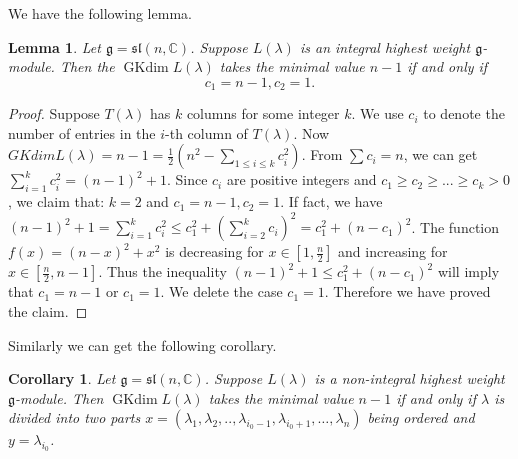 \documentclass{amsart}[12pt]
\newtheorem{Lem}{Lemma}[section]
\newtheorem{Cor}{Corollary}[section]
\newcommand{\gkd}{\operatorname{GKdim}}
\numberwithin{equation}{section}
\begin{document}
We have the following lemma.


\begin{Lem}\label{c12}
Let $ \mathfrak{g}=\mathfrak{sl}(n,\mathbb{C}) $. Suppose $L(\lambda)$ is an integral highest weight $\mathfrak{g}$-module. Then  the $\gkd L(\lambda)$ takes the minimal value $n-1$ if and only if
$$c_1=n-1, c_2=1.$$
\end{Lem}
\begin{proof} Suppose  $T(\lambda)$   has $k$  columns for some integer $k$. We use $ c_i $ to denote the number of entries in the $i$-th column of  $T(\lambda)$.
Now $GKdimL(\lambda)=n-1=\frac{1}{2}(n^2-\sum\limits_{1\leq i \leq k}c_i^2)$. From $\sum c_i=n$, we can get $\sum\limits_{i=1}^{k} c_i^2=(n-1)^2+1$.
Since $c_i$ are positive integers and $c_1\geq c_2\geq...\geq c_k>0$, we  claim that: $k=2$ and $c_1=n-1,c_2=1$.
If fact, we have $(n-1)^2+1=\sum\limits_{i=1}^{k} c_i^2\leq c_1^2+(\sum\limits_{i=2}^{k} c_i)^2=c_1^2+(n-c_1)^2$. The function $f(x)=(n-x)^2+x^2$ is decreasing for $x\in[1,\frac{n}{2}]$ and increasing for $x\in[\frac{n}{2},n-1]$. Thus the inequality $(n-1)^2+1\leq c_1^2+(n-c_1)^2$ will imply that $c_1=n-1$ or $c_1=1$. We delete the case $c_1=1$. Therefore we have proved the claim.
\end{proof}

Similarly we can get the following corollary.
\begin{Cor}\label{non}
Let $ \mathfrak{g}=\mathfrak{sl}(n,\mathbb{C}) $. Suppose $L(\lambda)$ is a non-integral highest weight $\mathfrak{g}$-module. Then   $\gkd L(\lambda)$ takes the minimal value $n-1$ if
and only if $\lambda$ is divided into two parts $x=(\lambda_1,\lambda_2,..,\lambda_{i_0-1},\lambda_{i_0+1},\dots,\lambda_n)$ being ordered and $y=\lambda_{i_0}$.
\end{Cor}
\end{document}
